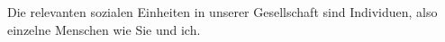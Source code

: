 Die relevanten sozialen Einheiten in unserer Gesellschaft sind Individuen, also einzelne Menschen wie Sie und ich.